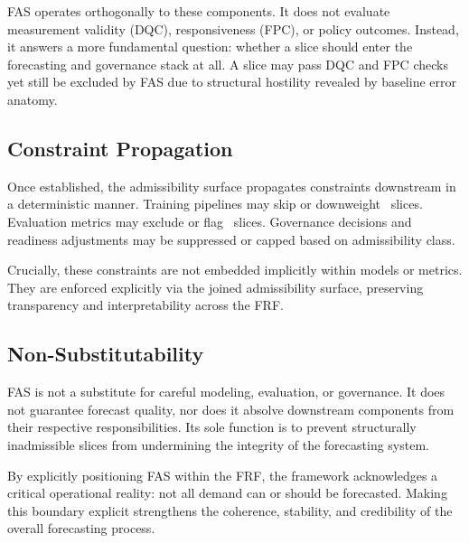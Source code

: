 FAS operates orthogonally to these components. It does not evaluate measurement
validity (DQC), responsiveness (FPC), or policy outcomes. Instead, it answers a
more fundamental question: whether a slice should enter the forecasting and
governance stack at all. A slice may pass DQC and FPC checks yet still be excluded
by FAS due to structural hostility revealed by baseline error anatomy.

\subsection{Constraint Propagation}

Once established, the admissibility surface propagates constraints downstream in
a deterministic manner. Training pipelines may skip or downweight \Blocked\
slices. Evaluation metrics may exclude or flag \Conditional\ slices. Governance
decisions and readiness adjustments may be suppressed or capped based on
admissibility class.

Crucially, these constraints are not embedded implicitly within models or
metrics. They are enforced explicitly via the joined admissibility surface,
preserving transparency and interpretability across the FRF.

\subsection{Non-Substitutability}

FAS is not a substitute for careful modeling, evaluation, or governance. It does
not guarantee forecast quality, nor does it absolve downstream components from
their respective responsibilities. Its sole function is to prevent structurally
inadmissible slices from undermining the integrity of the forecasting system.

By explicitly positioning FAS within the FRF, the framework acknowledges a
critical operational reality: not all demand can or should be forecasted. Making
this boundary explicit strengthens the coherence, stability, and credibility of
the overall forecasting process.
